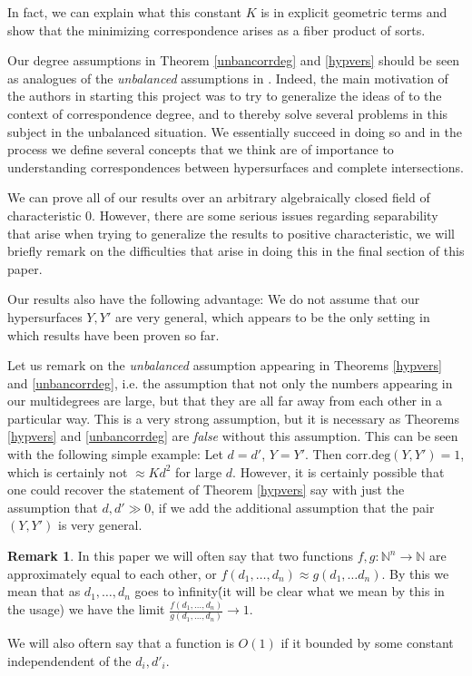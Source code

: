 \documentclass[12pt]{amsart}
\numberwithin{equation}{section}
\numberwithin{theorem}{section}
\theoremstyle{definition}
\theoremstyle{definition}
\newtheorem{remark}[theorem]{Remark}
\def\NN{{\mathbb N}}
\newcommand{\cd}{\textrm{corr.deg}}
\begin{document}
In fact, we can explain what this constant $K$ is in explicit geometric terms and show that the minimizing correspondence arises as a fiber product of sorts. 

Our degree assumptions in Theorem \ref{unbancorrdeg} and \ref{hypvers} should be seen as analogues of the \emph{unbalanced} assumptions  in \cite{LUS}. Indeed, the main motivation of the authors in starting this project was to try to generalize the ideas of \cite{LUS} to the context of correspondence degree, and to thereby  solve several  problems in this subject in the unbalanced situation. We essentially succeed in doing so and in the process we define several concepts that we think are of importance to understanding correspondences between hypersurfaces and complete intersections. 

We can  prove all of our results over an arbitrary algebraically closed field of characteristic 0. However, there are some serious issues regarding separability that arise when trying to generalize the results to positive characteristic, we will briefly remark on the difficulties that arise in doing this in the final section of this paper.

Our results also have the following advantage: We do not assume that our hypersurfaces $Y, Y'$ are very general, which appears to be the only setting in which results have been proven so far.

Let us remark  on the \emph{unbalanced} assumption appearing in Theorems \ref{hypvers} and \ref{unbancorrdeg}, i.e. the assumption that not only the numbers appearing in our multidegrees are large, but that they are all far away from each other in a particular way. This is a very strong assumption, but it is necessary as Theorems \ref{hypvers} and \ref{unbancorrdeg}  are \emph{false} without this assumption. This can be seen with the following simple example: Let $d= d'$, $Y= Y'$. Then $\cd(Y,Y') =1$, which is certainly not $\approx K d^2$ for large $d$. However, it is certainly possible that one could recover the statement of Theorem \ref{hypvers} say with just the assumption that $d, d' \gg 0$, if we add the additional assumption that the pair $(Y, Y')$ is very general.
\begin{remark}
    In this paper we will often say that two functions $f, g : \NN^n \to \NN$ are approximately equal to each other, or $f(d_1 ,\dots, d_n) \approx g(d_1, \dots d_n)$. By this we mean that as $d_1, \dots, d_n$ goes to \` infinity\' (it will be clear what we mean by this in the usage) we have the limit $\frac{f(d_1, \dots, d_n)}{g (d_1 ,\dots, d_n )}  \to 1.$

    We will also oftern say that a function is $O(1)$ if it bounded by some constant independendent of the $d_i, d'_i$.
\end{remark}
\end{document}

